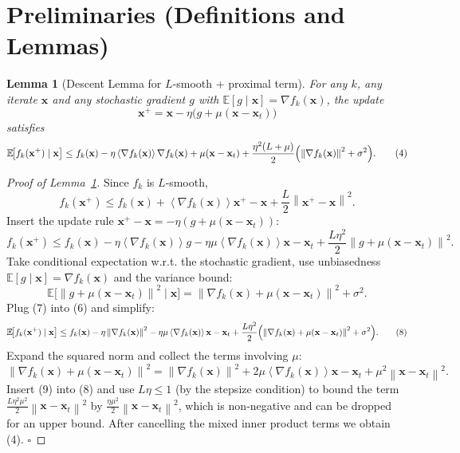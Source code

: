 \documentclass{article}
\newtheorem{lemma}{Lemma}
\newcommand{\E}{\mathbb{E}}
\newcommand{\norm}[1]{\left\|#1\right\|}
\newcommand{\inner}[1]{\left\langle#1\right\rangle}
\begin{document}
\section*{Preliminaries (Definitions and Lemmas)}
\begin{lemma}[Descent Lemma for $L$‑smooth + proximal term]\label{lem:descent}
For any $k$, any iterate $\mathbf{x}$ and any stochastic gradient $g$ with $\E[g\mid\mathbf{x}]=\nabla f_k(\mathbf{x})$, the update
\[
\mathbf{x}^+ = \mathbf{x} -\eta\bigl(g+\mu(\mathbf{x}-\mathbf{x}_t)\bigr)
\]
satisfies
\[
\E\!\bigl[f_k(\mathbf{x}^+)\mid\mathbf{x}\bigr]
\le f_k(\mathbf{x}) -\eta\inner{\nabla f_k(\mathbf{x})}{\nabla f_k(\mathbf{x})+\mu(\mathbf{x}-\mathbf{x}_t)}
   +\frac{\eta^2(L+\mu)}{2}\Bigl(\norm{\nabla f_k(\mathbf{x})}^2+\sigma^2\Bigr).
\tag{4}
\]
\end{lemma}
\begin{proof}[Proof of Lemma~\ref{lem:descent}]
Since $f_k$ is $L$‑smooth,
\[
f_k(\mathbf{x}^+)\le f_k(\mathbf{x})+\inner{\nabla f_k(\mathbf{x})}{\mathbf{x}^+-\mathbf{x}}
   +\frac{L}{2}\norm{\mathbf{x}^+-\mathbf{x}}^2 .
\tag{5}
\]
Insert the update rule $\mathbf{x}^+-\mathbf{x}= -\eta(g+\mu(\mathbf{x}-\mathbf{x}_t))$:
\[
f_k(\mathbf{x}^+)\le f_k(\mathbf{x})
   -\eta\inner{\nabla f_k(\mathbf{x})}{g}
   -\eta\mu\inner{\nabla f_k(\mathbf{x})}{\mathbf{x}-\mathbf{x}_t}
   +\frac{L\eta^2}{2}\norm{g+\mu(\mathbf{x}-\mathbf{x}_t)}^2 .
\tag{6}
\]
Take conditional expectation w.r.t. the stochastic gradient, use unbiasedness $\E[g\mid\mathbf{x}]=\nabla f_k(\mathbf{x})$ and the variance bound:
\[
\E\!\bigl[\norm{g+\mu(\mathbf{x}-\mathbf{x}_t)}^2\mid\mathbf{x}\bigr]
   =\norm{\nabla f_k(\mathbf{x})+\mu(\mathbf{x}-\mathbf{x}_t)}^2+\sigma^2 .
\tag{7}
\]
Plug (7) into (6) and simplify:
\[
\E\!\bigl[f_k(\mathbf{x}^+)\mid\mathbf{x}\bigr]
\le f_k(\mathbf{x})
   -\eta\norm{\nabla f_k(\mathbf{x})}^2
   -\eta\mu\inner{\nabla f_k(\mathbf{x})}{\mathbf{x}-\mathbf{x}_t}
   +\frac{L\eta^2}{2}\Bigl(\norm{\nabla f_k(\mathbf{x})+\mu(\mathbf{x}-\mathbf{x}_t)}^2+\sigma^2\Bigr).
\tag{8}
\]
Expand the squared norm and collect the terms involving $\mu$:
\[
\norm{\nabla f_k(\mathbf{x})+\mu(\mathbf{x}-\mathbf{x}_t)}^2
 =\norm{\nabla f_k(\mathbf{x})}^2+2\mu\inner{\nabla f_k(\mathbf{x})}{\mathbf{x}-\mathbf{x}_t}
   +\mu^2\norm{\mathbf{x}-\mathbf{x}_t}^2 .
\tag{9}
\]
Insert (9) into (8) and use $L\eta\le 1$ (by the stepsize condition) to bound the term $\frac{L\eta^2\mu^2}{2}\norm{\mathbf{x}-\mathbf{x}_t}^2$ by $\frac{\eta\mu^2}{2}\norm{\mathbf{x}-\mathbf{x}_t}^2$, which is non‑negative and can be dropped for an upper bound. After cancelling the mixed inner product terms we obtain (4). \hfill\(\square\) \end{proof}
\end{document}

